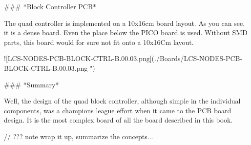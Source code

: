 ### *Block Controller PCB*

The quad controller is implemented on a 10x16cm board layout. As you can see, it is a dense board. Even the place below the PICO board is used. Without SMD parts, this board would for sure not fit onto a 10x16Cm layout.

![LCS-NODES-PCB-BLOCK-CTRL-B.00.03.png](./Boards/LCS-NODES-PCB-BLOCK-CTRL-B.00.03.png ")

### *Summary*

Well, the design of the quad block controller, although simple in the individual components, was a champions league effort when it came to the PCB board design. It is the most complex board of all the board described in this book.

// ??? note wrap it up, summarize the concepts...

